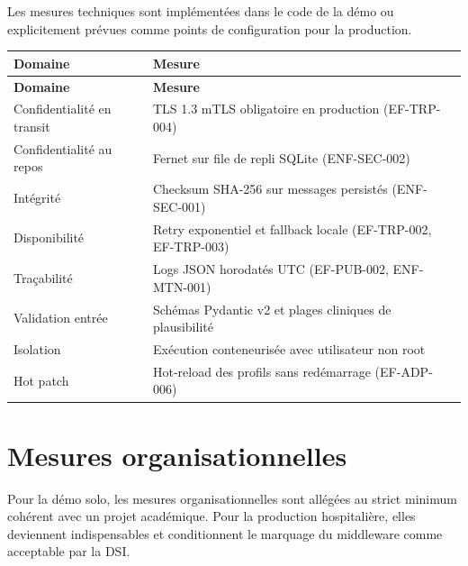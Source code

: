 Les mesures techniques sont implémentées dans le code de la démo ou explicitement prévues comme points de configuration pour la production.

\bridgezebra
\begin{longtable}{p{4.5cm}p{9.5cm}}
  \toprule
  \rowcolor{bridgeblue!90}
  {\color{white}\bfseries Domaine} & {\color{white}\bfseries Mesure} \\
  \midrule
  \endfirsthead
  \toprule
  \rowcolor{bridgeblue!90}
  {\color{white}\bfseries Domaine} & {\color{white}\bfseries Mesure} \\
  \midrule
  \endhead
  \bottomrule
  \endfoot
  Confidentialité en transit  & TLS 1.3 mTLS obligatoire en production (EF-TRP-004) \\
  Confidentialité au repos    & Fernet sur file de repli SQLite (ENF-SEC-002) \\
  Intégrité                   & Checksum SHA-256 sur messages persistés (ENF-SEC-001) \\
  Disponibilité               & Retry exponentiel et fallback locale (EF-TRP-002, EF-TRP-003) \\
  Traçabilité                 & Logs JSON horodatés UTC (EF-PUB-002, ENF-MTN-001) \\
  Validation entrée           & Schémas Pydantic v2 et plages cliniques de plausibilité \\
  Isolation                   & Exécution conteneurisée avec utilisateur non root \\
  Hot patch                   & Hot-reload des profils sans redémarrage (EF-ADP-006) \\
\end{longtable}

\section{Mesures organisationnelles}
\label{sec:securite-mesures-organisationnelles}

Pour la démo solo, les mesures organisationnelles sont allégées au strict minimum cohérent avec un projet académique. Pour la production hospitalière, elles deviennent indispensables et conditionnent le marquage du middleware comme acceptable par la DSI.

